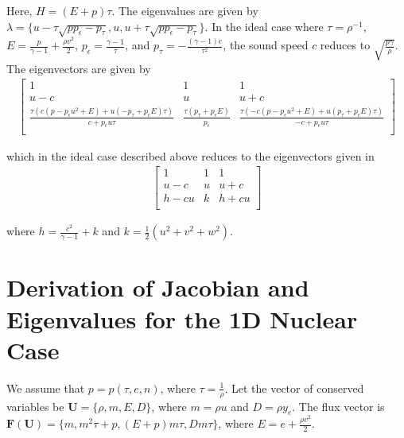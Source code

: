 \documentclass[twocolumn]{aastex62}
\begin{document}
Here, $H = (E+p)\tau$. The eigenvalues are given by $\lambda = \{u - \tau \sqrt{p p_{\epsilon} - p_{\tau}}, u,  u + \tau \sqrt{ p p_{\epsilon} - p_{\tau}}\}$. In the ideal case where
$\tau = \rho^{-1}$, $ E = \frac{p}{\gamma -1} + \frac{\rho v^{2}}{2}$, $ p_{\epsilon} = \frac{\gamma-1}{\tau}$, and $p_{\tau} = -\frac{(\gamma - 1)e}{\tau^{2}}$,
the sound speed $c$ reduces to $\sqrt{\frac{p \gamma}{\rho}}$. \\

The eigenvectors are given by \\

\begin{align}
	\left[
		\begin{array}{c|c|c}
			1 & 1 & 1 \\
			u - c & u & u + c \\
			\frac{\tau( c( p-p_{\epsilon}u^{2} +E) +u( -p_{\tau} + p_{\epsilon}E)\tau)}{c + p_{\epsilon}u\tau} & \frac{\tau(p_{\tau} + p_{\epsilon}E)}{p_{\epsilon}} &
			\frac{\tau( -c( p-p_{\epsilon}u^{2} +E) +u( p_{\tau} + p_{\epsilon}E)\tau)}{-c + p_{\epsilon}u\tau} \\
		\end{array}
	\right]
\end{align}


which in the ideal case described above reduces to  the eigenvectors given in \citet{schaal:2015a}\\

\begin{align}
	\left[
		\begin{array}{c|c|c}
			1 & 1 & 1 \\
			u - c & u & u + c \\
			h - cu & k & h + cu \\
		\end{array}
	\right]
\end{align}

where $h = \frac{c^{2}}{\gamma - 1} + k$ and $k = \frac{1}{2}(u^{2} + v^{2} + w^{2})$.




\section{Derivation of Jacobian and Eigenvalues for the 1D Nuclear Case}

We assume that $p = p(\tau, e, n)$, where $\tau = \frac{1}{\rho}$. Let the vector of conserved variables be $\textbf{U} = \{\rho, m, E, D\}$,
where $m = \rho u$ and $D = \rho y_{e}$. The flux vector is $\textbf{F}(\textbf{U}) = \{m, m^{2}\tau + p, (E+p)m\tau, Dm\tau\}$, where $E=e+\frac{\rho v^{2}}{2}$.
\end{document}
